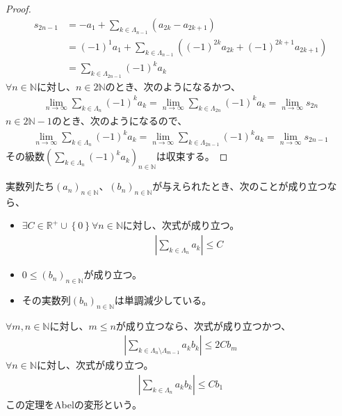 \documentclass[dvipdfmx]{jsarticle}
\begin{document}
\begin{proof}
\begin{align*}
s_{2n - 1} &= - a_{1} + \sum_{k \in \varLambda_{n - 1}} \left( a_{2k} - a_{2k + 1} \right)\\
&= ( - 1)^{1}a_{1} + \sum_{k \in \varLambda_{n - 1}} \left( ( - 1)^{2k}a_{2k} + ( - 1)^{2k + 1}a_{2k + 1} \right)\\
&= \sum_{k \in \varLambda_{2n - 1}} {( - 1)^{k}a_{k}}
\end{align*}
$\forall n \in \mathbb{N}$に対し、$n \in 2\mathbb{N}$のとき、次のようになるかつ、
\begin{align*}
\lim_{n \rightarrow \infty}{\sum_{k \in \varLambda_{n}} {( - 1)^{k}a_{k}}} = \lim_{n \rightarrow \infty}{\sum_{k \in \varLambda_{2n}} {( - 1)^{k}a_{k}}} = \lim_{n \rightarrow \infty}s_{2n}
\end{align*}
$n \in 2\mathbb{N} - 1$のとき、次のようになるので、
\begin{align*}
\lim_{n \rightarrow \infty}{\sum_{k \in \varLambda_{n}} {( - 1)^{k}a_{k}}} = \lim_{n \rightarrow \infty}{\sum_{k \in \varLambda_{2n - 1}} {( - 1)^{k}a_{k}}} = \lim_{n \rightarrow \infty}s_{2n - 1}
\end{align*}
その級数$\left( \sum_{k \in \varLambda_{n}} {( - 1)^{k}a_{k}} \right)_{n \in \mathbb{N}}$は収束する。
\end{proof}
\begin{thm}[Abelの変形]\label{4.1.8.26}
実数列たち$\left( a_{n} \right)_{n \in \mathbb{N}}$、$\left( b_{n} \right)_{n \in \mathbb{N}}$が与えられたとき、次のことが成り立つなら、
\begin{itemize}
\item
  $\exists C \in \mathbb{R}^{+} \cup \left\{ 0 \right\}\forall n \in \mathbb{N}$に対し、次式が成り立つ。
\begin{align*}
\left| \sum_{k \in \varLambda_{n}} a_{k} \right| \leq C
\end{align*}
\item
  $0 \leq \left( b_{n} \right)_{n \in \mathbb{N}}$が成り立つ。
\item
  その実数列$\left( b_{n} \right)_{n \in \mathbb{N}}$は単調減少している。
\end{itemize}
$\forall m,n \in \mathbb{N}$に対し、$m \leq n$が成り立つなら、次式が成り立つかつ、
\begin{align*}
\left| \sum_{k \in \varLambda_{n} \setminus \varLambda_{m - 1}} {a_{k}b_{k}} \right| \leq 2Cb_{m}
\end{align*}
$\forall n \in \mathbb{N}$に対し、次式が成り立つ。
\begin{align*}
\left| \sum_{k \in \varLambda_{n}} {a_{k}b_{k}} \right| \leq Cb_{1}
\end{align*}
この定理をAbelの変形という。
\end{thm}
\end{document}
